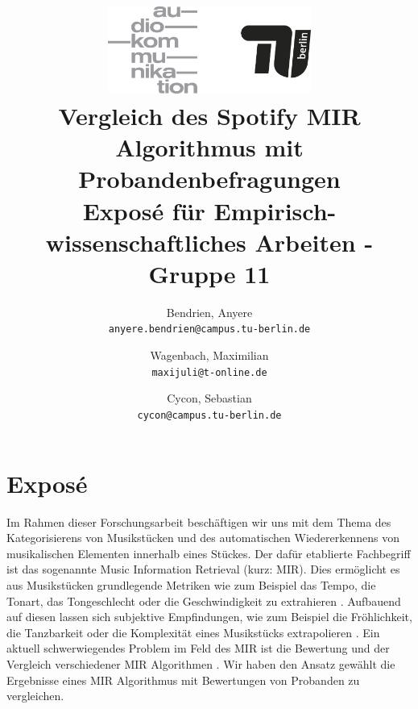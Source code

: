 





\title{
    \includegraphics[width=0.5\textwidth]{fig/audiokommtu-01.png}\\
    Vergleich des Spotify MIR Algorithmus mit Probandenbefragungen\\
    \vspace{2mm}
    \small{Exposé für Empirisch-wissenschaftliches Arbeiten - Gruppe 11}
}
\author
{
Bendrien, Anyere \\
\small\texttt{anyere.bendrien@campus.tu-berlin.de}
\and
Wagenbach, Maximilian \\
\small\texttt{maxijuli@t-online.de}
\and
Cycon, Sebastian \\
\small\texttt{cycon@campus.tu-berlin.de}
}

\maketitle

\thispagestyle{empty} \newpage \setcounter{page}{1}


\section{Exposé}

Im Rahmen dieser Forschungsarbeit beschäftigen wir uns mit dem Thema des Kategorisierens von Musikstücken und des automatischen Wiedererkennens von musikalischen Elementen innerhalb eines Stückes.
Der dafür etablierte Fachbegriff ist das sogenannte Music Information Retrieval (kurz: MIR).
Dies ermöglicht es aus Musikstücken grundlegende Metriken wie zum Beispiel das Tempo, die Tonart, das Tongeschlecht oder die Geschwindigkeit zu extrahieren \cite{Casey2008}.
Aufbauend auf diesen lassen sich subjektive Empfindungen, wie zum Beispiel die Fröhlichkeit, die Tanzbarkeit oder die Komplexität eines Musikstücks extrapolieren \cite{Sturm2013}.
Ein aktuell schwerwiegendes Problem im Feld des MIR ist die Bewertung und der Vergleich verschiedener MIR Algorithmen \cite{Downie2004} \cite{Urbano_2013}. Wir haben den Ansatz gewählt die Ergebnisse eines MIR Algorithmus mit Bewertungen von Probanden zu vergleichen.



